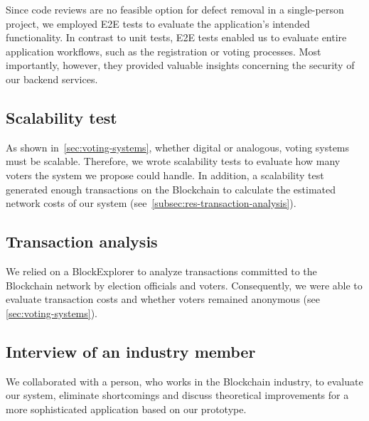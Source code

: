 Since code reviews are no feasible option for defect removal in a single-person project, we employed \gls{E2E} tests to evaluate the application’s intended functionality.
In contrast to unit tests, \gls{E2E} tests enabled us to evaluate entire application workflows, such as the registration or voting processes.
Most importantly, however, they provided valuable insights concerning the security of our backend services.

\subsection{Scalability test}\label{subsec:scalability-test}

As shown in~\cref{sec:voting-systems}, whether digital or analogous, voting systems must be scalable.
Therefore, we wrote scalability tests to evaluate how many voters the system we propose could handle.
In addition, a scalability test generated enough transactions on the \gls{Blockchain} to calculate the estimated network costs of our system (see~\cref{subsec:res-transaction-analysis}).

\subsection{Transaction analysis}\label{subsec:transaction-analysis}

We relied on a \gls{BlockExplorer} to analyze transactions committed to the \gls{Blockchain} network by election officials and voters.
Consequently, we were able to evaluate transaction costs and whether voters remained anonymous (see \cref{sec:voting-systems}).

\subsection{Interview of an industry member}\label{subsec:interview-of-industry-member}

We collaborated with a person, who works in the \gls{Blockchain} industry, to evaluate our system, eliminate shortcomings and discuss theoretical improvements for a more sophisticated application based on our prototype.
